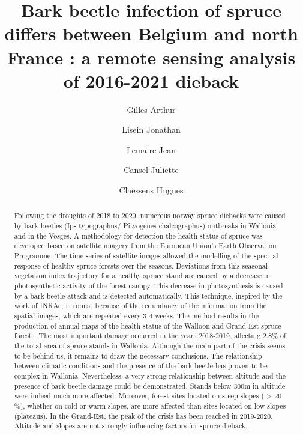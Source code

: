 \documentclass[3p,procedia]{elsarticle}
\begin{document}
\begin{frontmatter}

\author[label2]{Gilles Arthur}
\author[label2]{Lisein Jonathan}
\author[label3]{Lemaire Jean}
\author[label3]{Cansel Juliette}
\author[label2]{Claessens Hugues}



\title{Bark beetle infection of spruce differs between Belgium and north France : a remote sensing analysis of 2016-2021 dieback}

\begin{abstract}
Following the droughts of 2018 to 2020, numerous norway spruce diebacks were caused by bark beetles (Ips typographus/ Pityogenes chalcographus) outbreaks in Wallonia and in the Vosges. A methodology for detection the health status of spruce was developed based on satellite imagery from the European Union's Earth Observation Programme. The time series of satellite images allowed the modelling of the spectral response of healthy spruce forests over the seasons. Deviations from this seasonal vegetation index trajectory for a healthy spruce stand are caused by a decrease in photosynthetic activity of the forest canopy. This decrease in photosynthesis is caused by a bark beetle attack and is detected automatically. This technique, inspired by the work of INRAe, is robust because of the redundancy of the information from the spatial images, which are repeated every 3-4 weeks. The method results in the production of annual maps of the health status of the Walloon and Grand-Est spruce forests. The most important damage occurred in the years 2018-2019, affecting 2.8\% of the total area of spruce stands in Wallonia. Although the main part of the crisis seems to be behind us, it remains to draw the necessary conclusions. The relationship between climatic conditions and the presence of the bark beetle has proven to be complex in Wallonia. Nevertheless, a very strong relationship between altitude and the presence of bark beetle damage could be demonstrated. Stands below 300m in altitude were indeed much more affected. Moreover, forest sites located on steep slopes ( > 20 \%), whether on cold or warm slopes, are more affected than sites located on low slopes (plateaus). In the Grand-Est, the peak of the crisis has been reached in 2019-2020. Altitude and slopes are not strongly influencing factors for spruce dieback. 


\end{abstract}

\begin{keyword}
\end{keyword}

\end{frontmatter}
\end{document}
